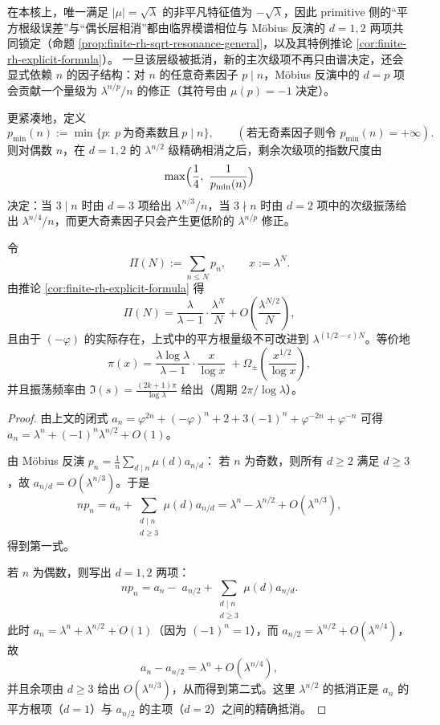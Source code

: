 \begin{remark}\label{rem:finite-rh-factor-controls-secondary}
在本核上，唯一满足 $|\mu|=\sqrt{\lambda}$ 的非平凡特征值为 $-\sqrt{\lambda}$，因此 primitive 侧的“平方根级误差”与“偶长层相消”都由临界模谱相位与 Möbius 反演的 $d=1,2$ 两项共同锁定（命题 \ref{prop:finite-rh-sqrt-resonance-general}，以及其特例推论 \ref{cor:finite-rh-explicit-formula}）。
一旦该层级被抵消，新的主次级项不再只由谱决定，还会显式依赖 $n$ 的因子结构：对 $n$ 的任意奇素因子 $p\mid n$，Möbius 反演中的 $d=p$ 项会贡献一个量级为 $\lambda^{n/p}/n$ 的修正（其符号由 $\mu(p)=-1$ 决定）。
\par
更紧凑地，定义
\[
p_{\min}(n):=\min\{p:\ p\ \text{为奇素数且}\ p\mid n\},
\qquad(\text{若无奇素因子则令 }p_{\min}(n)=+\infty).
\]
则对偶数 $n$，在 $d=1,2$ 的 $\lambda^{n/2}$ 级精确相消之后，剩余次级项的指数尺度由
\[
\max\Bigl(\frac14,\ \frac{1}{p_{\min}(n)}\Bigr)
\]
决定：当 $3\mid n$ 时由 $d=3$ 项给出 $\lambda^{n/3}/n$，当 $3\nmid n$ 时由 $d=2$ 项中的次级振荡给出 $\lambda^{n/4}/n$，而更大奇素因子只会产生更低阶的 $\lambda^{n/p}$ 修正。
\end{remark}

\begin{corollary}\label{cor:finite-rh-prime-orbit-osc}
令
\[
\Pi(N):=\sum_{n\le N}p_n,\qquad x:=\lambda^N.
\]
由推论 \ref{cor:finite-rh-explicit-formula} 得
\[
\Pi(N)=\frac{\lambda}{\lambda-1}\cdot\frac{\lambda^N}{N}+O\!\left(\frac{\lambda^{N/2}}{N}\right),
\]
且由于 $(-\varphi)$ 的实际存在，上式中的平方根量级不可改进到 $\lambda^{(1/2-\varepsilon)N}$。等价地
\[
\pi(x)=\frac{\lambda\log\lambda}{\lambda-1}\cdot\frac{x}{\log x}
\;+\Omega_{\pm}\!\left(\frac{x^{1/2}}{\log x}\right),
\]
并且振荡频率由 $\Im(s)=\frac{(2k+1)\pi}{\log\lambda}$ 给出（周期 $2\pi/\log\lambda$）。
\end{corollary}

\begin{proof}
由上文的闭式
\(
a_n=\varphi^{2n}+(-\varphi)^n+2+3(-1)^n+\varphi^{-2n}+\varphi^{-n}
\)
可得
\(
a_n=\lambda^n+(-1)^n\lambda^{n/2}+O(1)
\)。

由 Möbius 反演 $p_n=\frac1n\sum_{d\mid n}\mu(d)a_{n/d}$：
若 $n$ 为奇数，则所有 $d\ge 2$ 满足 $d\ge 3$，故 $a_{n/d}=O(\lambda^{n/3})$。于是
\[
np_n=a_n+\sum_{\substack{d\mid n\\ d\ge 3}}\mu(d)a_{n/d}
=\lambda^n-\lambda^{n/2}+O(\lambda^{n/3}),
\]
得到第一式。

若 $n$ 为偶数，则写出 $d=1,2$ 两项：
\[
np_n=a_n-\;a_{n/2}+\sum_{\substack{d\mid n\\ d\ge 3}}\mu(d)a_{n/d}.
\]
此时 $a_n=\lambda^n+\lambda^{n/2}+O(1)$（因为 $(-1)^n=1$），而 $a_{n/2}=\lambda^{n/2}+O(\lambda^{n/4})$，故
\[
a_n-a_{n/2}=\lambda^n+O(\lambda^{n/4}),
\]
并且余项由 $d\ge 3$ 给出 $O(\lambda^{n/3})$，从而得到第二式。这里 $\lambda^{n/2}$ 的抵消正是 $a_n$ 的平方根项（$d=1$）与 $a_{n/2}$ 的主项（$d=2$）之间的精确抵消。
\end{proof}

